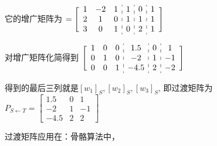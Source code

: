它的增广矩阵为
\begin{math}
    [ { \begin{array}{c:c:c:c} 
        \begin{matrix} v_1&v_2&v_3 \end{matrix} &
        \begin{matrix} w_1 \end{matrix} &
        \begin{matrix} w_2 \end{matrix} &
        \begin{matrix} w_3 \end{matrix} 
    \end{array}} ] = \Bigg [ {\begin{array}{c:c:c:c} 
        \begin{matrix} 1&-2&1\\2&1&0\\3&0&1 \end{matrix} &
        \begin{matrix} 1\\1\\0 \end{matrix} &
        \begin{matrix} 0\\1\\2 \end{matrix} &
        \begin{matrix} 1\\1\\1 \end{matrix} 
    \end{array}}
    \Bigg ]
\end{math}

对增广矩阵化简得到
\begin{math}
    \Bigg [ {\begin{array}{c:c:c:c} 
    \begin{matrix} 1&0&0\\0&1&0\\0&0&1 \end{matrix} &
    \begin{matrix} 1.5\\-2\\-4.5 \end{matrix} &
    \begin{matrix} 0\\1\\2 \end{matrix} &
    \begin{matrix} 1\\-1\\-2 \end{matrix} 
\end{array}}
\Bigg ]
\end{math}

得到的最后三列就是$[w_1]_S, [w_2]_S,[w_3]_S$, 即过渡矩阵为
\begin{math}
    P_{S \leftarrow T} = \begin{bmatrix}
        1.5 & 0 & 1 \\
        -2 & 1 & -1 \\
        -4.5 & 2 & 2
    \end{bmatrix}
\end{math}

过渡矩阵应用在：骨骼算法中，

